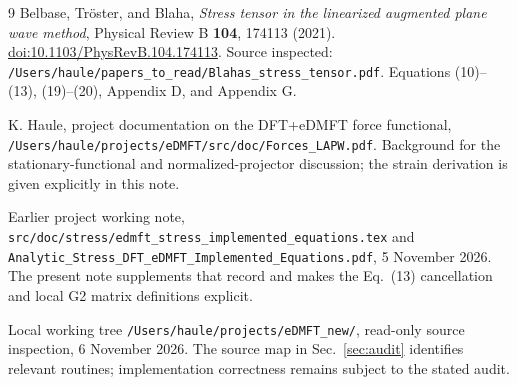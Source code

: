 \documentclass[11pt]{article}
\newcommand{\pathf}[1]{\nolinkurl{#1}}
\begin{document}
\begin{thebibliography}{9}
Belbase, Tr\"oster, and Blaha,
\emph{Stress tensor in the linearized augmented plane wave method},
Physical Review B \textbf{104}, 174113 (2021).
\href{https://doi.org/10.1103/PhysRevB.104.174113}{doi:10.1103/PhysRevB.104.174113}.
Source inspected: \pathf{/Users/haule/papers_to_read/Blahas_stress_tensor.pdf}.
Equations (10)--(13), (19)--(20), Appendix D, and Appendix G.

K. Haule, project documentation on the DFT+eDMFT force functional,
\pathf{/Users/haule/projects/eDMFT/src/doc/Forces_LAPW.pdf}.
Background for the stationary-functional and normalized-projector
discussion; the strain derivation is given explicitly in this note.

Earlier project working note,
\pathf{src/doc/stress/edmft_stress_implemented_equations.tex}
and \pathf{Analytic_Stress_DFT_eDMFT_Implemented_Equations.pdf},
5 November 2026. The present note supplements that record and makes
the Eq.\ (13) cancellation and local G2 matrix definitions explicit.

Local working tree \pathf{/Users/haule/projects/eDMFT_new/},
read-only source inspection, 6 November 2026.
The source map in Sec.~\ref{sec:audit} identifies relevant routines;
implementation correctness remains subject to the stated audit.
\end{thebibliography}
\end{document}
